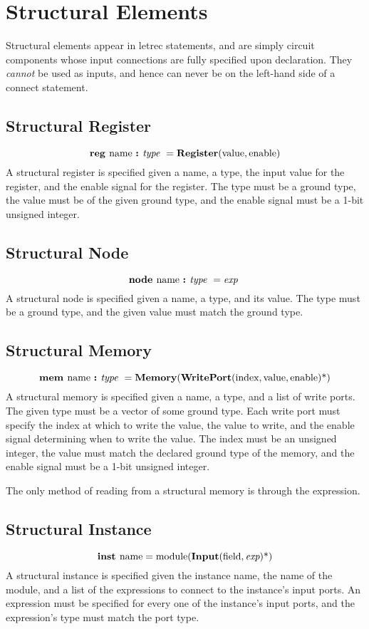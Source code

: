 \documentclass[12pt]{article}
\begin{document}
\section{Structural Elements} \label{elements}

Structural elements appear in letrec statements, and are simply circuit components whose input connections are fully specified upon declaration.
They {\em cannot} be used as inputs, and hence can never be on the left-hand side of a connect statement. 

\subsection{Structural Register}
\[
\text{\bf reg\ } \text{name } \text{\bf :\ } \text{\em type\ } = \text{\bf Register}(\text{value}, \text{enable})   
\]
A structural register is specified given a name, a type, the input value for the register, and the enable signal for the register.
The type must be a ground type, the value must be of the given ground type, and the enable signal must be a 1-bit unsigned integer. 

\subsection{Structural Node}
\[
\text{\bf node\ } \text{name } \text{\bf :\ } \text{\em type\ } = \text{\em exp\ }
\]
A structural node is specified given a name, a type, and its value.
The type must be a ground type, and the given value must match the ground type.

\subsection{Structural Memory}
\[
\text{\bf mem\ } \text{name } \text{\bf :\ } \text{\em type\ } =
\text{\bf Memory}(\text{\bf WritePort}(\text{index}, \text{value}, \text{enable})\text{*})  
\]
A structural memory is specified given a name, a type, and a list of write ports.
The given type must be a vector of some ground type.
Each write port must specify the index at which to write the value, the value to write, and the enable signal determining when to write the value.
The index must be an unsigned integer, the value must match the declared ground type of the memory, and the enable signal must be a 1-bit unsigned integer. 

The only method of reading from a structural memory is through the  expression. 

\subsection{Structural Instance}
\[
\text{\bf inst\ } \text{name} = \text{module}(\text{\bf Input}(\text{field},\text{\em exp})\text{*})              
\]
A structural instance is specified given the instance name, the name of the module, and a list of the expressions to connect to the instance's input ports.
An expression must be specified for every one of the instance's input ports, and the expression's type must match the port type.
\end{document}
